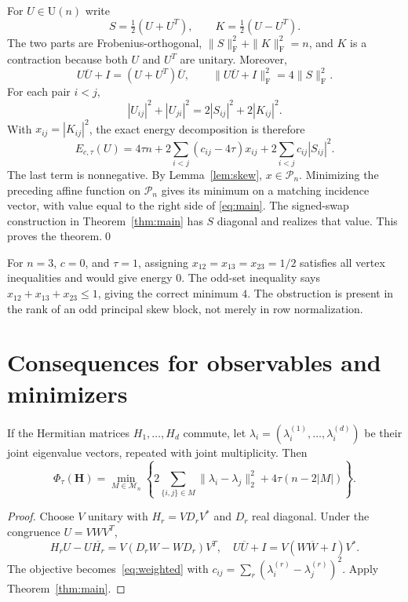 \documentclass[11pt]{article}
\newcommand{\U}{\mathrm U}
\newcommand{\F}{\mathrm F}
\newcommand{\cM}{\mathcal M}
\newcommand{\cP}{\mathcal P}
\begin{document}
For $U\in\U(n)$ write
\[
 S=\tfrac12(U+U^T),\qquad K=\tfrac12(U-U^T).
\]
The two parts are Frobenius-orthogonal, $\|S\|_\F^2+\|K\|_\F^2=n$,
and $K$ is a contraction because both $U$ and $U^T$ are unitary.
Moreover,
\begin{equation}\label{eq:residual}
 U\overline U+I=(U+U^T)\overline U,
 \qquad \|U\overline U+I\|_\F^2=4\|S\|_\F^2.
\end{equation}
For each pair $i<j$,
\[
 |U_{ij}|^2+|U_{ji}|^2=2|S_{ij}|^2+2|K_{ij}|^2.
\]
With $x_{ij}=|K_{ij}|^2$, the exact energy decomposition is therefore
\begin{equation}\label{eq:decomposition}
 E_{c,\tau}(U)=4\tau n+
  2\sum_{i<j}(c_{ij}-4\tau)x_{ij}
  +2\sum_{i<j}c_{ij}|S_{ij}|^2.
\end{equation}
The last term is nonnegative. By Lemma~\ref{lem:skew}, $x\in\cP_n$.
Minimizing the preceding affine function on $\cP_n$ gives its minimum
on a matching incidence vector, with value equal to the right side of
\eqref{eq:main}. The signed-swap construction in
Theorem~\ref{thm:main} has $S$ diagonal and realizes that value. This
proves the theorem.\qed

\begin{remark}
For $n=3$, $c=0$, and $\tau=1$, assigning $x_{12}=x_{13}=x_{23}=1/2$
satisfies all vertex inequalities and would give energy $0$. The
odd-set inequality says $x_{12}+x_{13}+x_{23}\leq1$, giving the correct
minimum $4$. The obstruction is present in the rank of an odd principal
skew block, not merely in row normalization.
\end{remark}

\section{Consequences for observables and minimizers}

\begin{corollary}\label{cor:tuple}
If the Hermitian matrices $H_1,\ldots,H_d$ commute, let
$\lambda_i=(\lambda_i^{(1)},\ldots,\lambda_i^{(d)})$ be their joint
eigenvalue vectors, repeated with joint multiplicity. Then
\begin{equation}\label{eq:tuple}
 \Phi_\tau(\mathbf H)=\min_{M\in\cM_n}
 \left\{2\sum_{\{i,j\}\in M}\|\lambda_i-\lambda_j\|_2^2
                    +4\tau(n-2|M|)\right\}.
\end{equation}
\end{corollary}
\begin{proof}
Choose $V$ unitary with $H_r=VD_rV^*$ and $D_r$ real diagonal.
Under the congruence $U=VWV^T$,
\[
 H_rU-U\overline{H_r}=V(D_rW-WD_r)V^T,\quad
 U\overline U+I=V(W\overline W+I)V^*.
\]
The objective becomes~\eqref{eq:weighted} with
$c_{ij}=\sum_r(\lambda_i^{(r)}-\lambda_j^{(r)})^2$.
Apply Theorem~\ref{thm:main}.
\end{proof}
\end{document}
